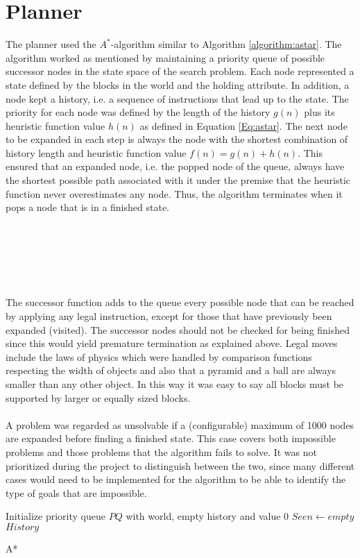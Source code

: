 \section{Planner} 
The planner used the $A^*$-algorithm similar to Algorithm \ref{algorithm:astar}.
The algorithm worked as mentioned by maintaining a priority queue of possible
successor nodes in the state space of the search problem. Each node represented a
state defined by the blocks in the world and the holding attribute. In addition,
a node kept a history, i.e. a sequence of instructions that lead up to the
state. The priority for each node was defined by the length of the history $g(n)$
plus its heuristic function value $h(n)$ as defined in Equation \ref{Eq:astar}.
The next node to be expanded in each step is always the node with the shortest
combination of history length and heuristic function value $f(n) = g(n) + h(n)$.
This ensured that an expanded node, i.e. the popped node of the queue, always
have the shortest possible path associated with it under the premise that the
heuristic function never overestimates any node. Thus, the algorithm terminates
when it pops a node that is in a finished state. 
\\\\\\\\\\\\\\
The successor function adds to the queue every possible node that can be reached
by applying any legal instruction, except for those that have previously been
expanded (visited). The successor nodes should not be checked for being finished
since this would yield premature termination as explained above. Legal moves
include the laws of physics which were handled by comparison functions
respecting the width of objects and also that a pyramid and a ball are always
smaller than any other object. In this way it was easy to say all blocks must be
supported by larger or equally sized blocks.
\\\\
A problem was regarded as unsolvable if a (configurable) maximum of 1000 nodes
are expanded before finding a finished state. This case covers both impossible
problems and those problems that the algorithm fails to solve. It was not
prioritized during the project to distinguish between the two, since many
different cases would need to be implemented for the algorithm to be able to
identify the type of goals that are impossible. \\
\begin{algorithm}[h!]
 \SetAlgoLined
 Initialize priority queue $PQ$ with world, empty history and value 0\;
 $Seen \leftarrow empty$\;
 \Return $History$
 \caption{A*}
 \label{algorithm:astar}
\end{algorithm} 

